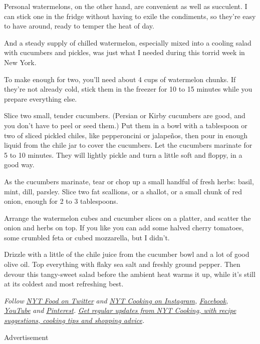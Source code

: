 Personal watermelons, on the other hand, are convenient as well as
succulent. I can stick one in the fridge without having to exile the
condiments, so they're easy to have around, ready to temper the heat of
day.

And a steady supply of chilled watermelon, especially mixed into a
cooling salad with cucumbers and pickles, was just what I needed during
this torrid week in New York.

To make enough for two, you'll need about 4 cups of watermelon chunks.
If they're not already cold, stick them in the freezer for 10 to 15
minutes while you prepare everything else.

Slice two small, tender cucumbers. (Persian or Kirby cucumbers are good,
and you don't have to peel or seed them.) Put them in a bowl with a
tablespoon or two of sliced pickled chiles, like pepperoncini or
jalapeños, then pour in enough liquid from the chile jar to cover the
cucumbers. Let the cucumbers marinate for 5 to 10 minutes. They will
lightly pickle and turn a little soft and floppy, in a good way.

As the cucumbers marinate, tear or chop up a small handful of fresh
herbs: basil, mint, dill, parsley. Slice two fat scallions, or a
shallot, or a small chunk of red onion, enough for 2 to 3 tablespoons.

Arrange the watermelon cubes and cucumber slices on a platter, and
scatter the onion and herbs on top. If you like you can add some halved
cherry tomatoes, some crumbled feta or cubed mozzarella, but I didn't.

Drizzle with a little of the chile juice from the cucumber bowl and a
lot of good olive oil. Top everything with flaky sea salt and freshly
ground pepper. Then devour this tangy-sweet salad before the ambient
heat warms it up, while it's still at its coldest and most refreshing
best.

\emph{Follow} \href{https://twitter.com/nytfood}{\emph{NYT Food on
Twitter}} \emph{and}
\href{https://www.instagram.com/nytcooking/}{\emph{NYT Cooking on
Instagram}}\emph{,}
\href{https://www.facebookcorewwwi.onion/nytcooking/}{\emph{Facebook}}\emph{,}
\href{https://www.youtube.com/nytcooking}{\emph{YouTube}} \emph{and}
\href{https://www.pinterest.com/nytcooking/}{\emph{Pinterest}}\emph{.}
\href{https://www.nytimes3xbfgragh.onion/newsletters/cooking}{\emph{Get
regular updates from NYT Cooking, with recipe suggestions, cooking tips
and shopping advice}}\emph{.}

Advertisement

